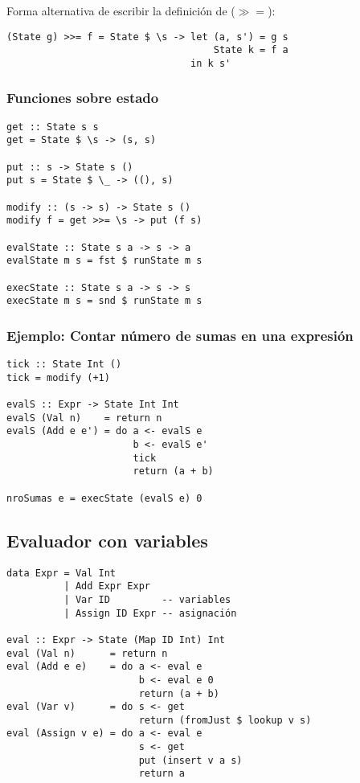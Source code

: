 \documentclass{article}
\begin{document}
Forma alternativa de escribir la definición de ($\gg=$):

\begin{lstlisting}
(State g) >>= f = State $ \s -> let (a, s') = g s
                                    State k = f a
                                in k s'
\end{lstlisting}

\subsubsection{Funciones sobre estado}

\begin{lstlisting}
get :: State s s
get = State $ \s -> (s, s)

put :: s -> State s ()
put s = State $ \_ -> ((), s)

modify :: (s -> s) -> State s ()
modify f = get >>= \s -> put (f s)

evalState :: State s a -> s -> a
evalState m s = fst $ runState m s

execState :: State s a -> s -> s
execState m s = snd $ runState m s
\end{lstlisting}

\subsubsection{Ejemplo: Contar número de sumas en una expresión}

\begin{lstlisting}
tick :: State Int ()
tick = modify (+1)

evalS :: Expr -> State Int Int
evalS (Val n)    = return n
evalS (Add e e') = do a <- evalS e
                      b <- evalS e'
                      tick
                      return (a + b)

nroSumas e = execState (evalS e) 0
\end{lstlisting}

\newpage

\subsection{Evaluador con variables}

\begin{lstlisting}
data Expr = Val Int
          | Add Expr Expr
          | Var ID         -- variables
          | Assign ID Expr -- asignación

eval :: Expr -> State (Map ID Int) Int
eval (Val n)      = return n
eval (Add e e)    = do a <- eval e
                       b <- eval e 0
                       return (a + b)
eval (Var v)      = do s <- get
                       return (fromJust $ lookup v s)
eval (Assign v e) = do a <- eval e
                       s <- get
                       put (insert v a s)
                       return a
\end{lstlisting}
\end{document}
